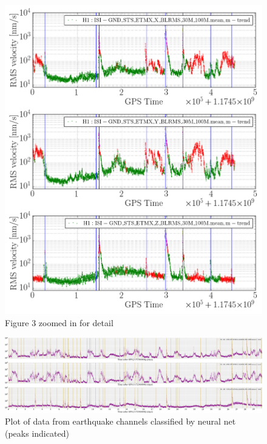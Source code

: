 \documentclass[colorlinks=true,pdfstartview=FitV,linkcolor=blue,
            citecolor=red,urlcolor=magenta]{ligodoc}
\begin{document}
\begin{figure}[htbp]
\begin{center}
\includegraphics[scale = 0.5]{EQdata_Kmeans_6_crop_2.png}
\caption{Figure 3 zoomed in for detail}
\label{fig:image4}
\end{center}
\end{figure}

\begin{figure}[htbp]
\begin{center}
\includegraphics[width=1.3\textwidth,angle=90]{ConvNet-Comparison2.png}
\caption{Plot of data from earthquake channels classified by neural net (peaks indicated)}
\label{fig:image5}
\end{center}
\end{figure}
\end{document}
